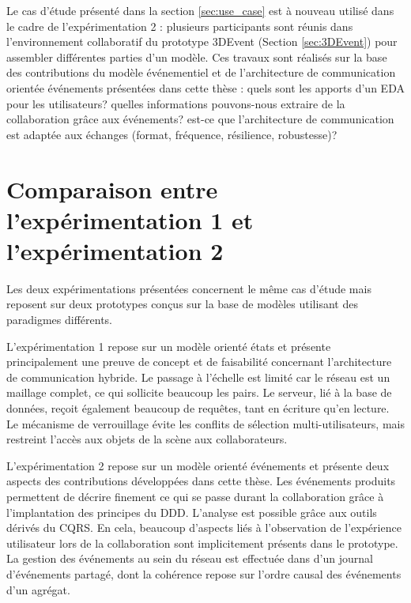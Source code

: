 Le cas d'étude présenté dans la section \ref{sec:use_case} est à nouveau utilisé 
dans le cadre de l'expérimentation 2 : plusieurs 
participants sont réunis dans l'environnement collaboratif du prototype 3DEvent 
(Section \ref{sec:3DEvent}) pour assembler différentes parties d'un modèle. Ces 
travaux sont réalisés sur la base des contributions du modèle événementiel et de 
l'architecture de communication orientée événements présentées dans cette thèse 
: quels sont les apports d'un 
\gls{EDA} pour les utilisateurs? quelles informations pouvons-nous extraire de la 
collaboration grâce aux événements? est-ce que l'architecture de communication 
est adaptée aux échanges (format, fréquence, résilience, robustesse)? 







\section{Comparaison entre l'expérimentation 1 et l'expérimentation 2}

Les deux expérimentations présentées concernent le même cas d'étude mais 
reposent sur deux prototypes conçus sur la base de modèles utilisant des 
paradigmes différents. 

L'expérimentation 1 repose sur un modèle orienté états et présente principalement 
une preuve de concept et de faisabilité concernant l'architecture de communication 
hybride. Le passage à l'échelle est limité car le réseau est un maillage 
complet, ce qui sollicite beaucoup les pairs. Le serveur, lié à la base de données, 
reçoit également beaucoup de requêtes, tant en écriture qu'en lecture. Le 
mécanisme de verrouillage évite les conflits de sélection multi-utilisateurs, mais 
restreint l'accès aux objets de la scène aux collaborateurs. 


L'expérimentation 2 repose sur un modèle orienté événements et présente deux 
aspects des contributions développées dans cette thèse. Les événements 
produits permettent de décrire finement ce qui se passe durant la 
collaboration grâce à l'implantation des principes du \gls{DDD}. L'analyse est 
possible grâce aux outils dérivés du \gls{CQRS}. En cela, beaucoup d'aspects liés 
à l'observation de l'expérience utilisateur lors de la collaboration sont implicitement 
présents dans le prototype. La gestion des événements au sein du réseau est 
effectuée dans d'un journal d'événements 
partagé, dont la cohérence repose sur l'ordre causal des événements d'un 
agrégat.


